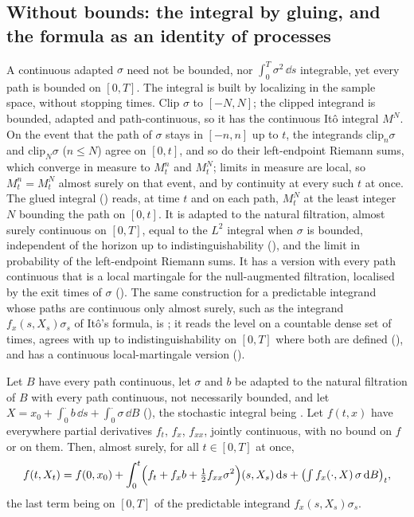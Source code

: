 \documentclass[11pt]{article}
\begin{document}
\subsection{Without bounds: the integral by gluing, and the formula as an identity of processes}\label{sec:unbounded}
A continuous adapted $\sigma$ need not be bounded, nor $\int_0^T\sigma^2\,\dd s$ integrable, yet every path is
bounded on $[0,T]$. The integral is built by localizing in the sample space, without stopping times. Clip $\sigma$ to
$[-N,N]$; the clipped integrand is bounded, adapted and path-continuous, so it has the continuous It\^o integral
$M^N$. On the event that the path of $\sigma$ stays in $[-n,n]$ up to $t$, the integrands $\mathrm{clip}_n\sigma$ and
$\mathrm{clip}_N\sigma$ ($n\le N$) agree on $[0,t]$, and so do their left-endpoint Riemann sums, which converge in
measure to $M^n_t$ and $M^N_t$; limits in measure are local, so $M^n_t=M^N_t$ almost surely on that event, and by
continuity at every such $t$ at once. The glued integral () reads, at time $t$ and on each
path, $M^N_t$ at the least integer $N$ bounding the path on $[0,t]$. It is adapted to the natural filtration, almost
surely continuous on $[0,T]$, equal to the $L^2$ integral when $\sigma$ is bounded, independent of the horizon up to
indistinguishability (), and the limit in probability of the left-endpoint
Riemann sums. It has a version with every path continuous that is a local martingale for the null-augmented
filtration, localised by the exit times of $\sigma$ (). The
same construction for a predictable integrand whose paths are continuous only almost surely, such as the integrand
$f_x(s,X_s)\sigma_s$ of It\^o's formula, is ; it reads the level on a countable dense set of
times, agrees with  up to indistinguishability on $[0,T]$ where both are defined
(), and has a continuous local-martingale version
().

\begin{theorem}\label{thm:process}
Let $B$ have every path continuous, let $\sigma$ and $b$ be adapted to the natural filtration of $B$ with every path
continuous, not necessarily bounded, and let $X=x_0+\int_0^\cdot b\,\dd s+\int_0^\cdot\sigma\,\dd B$
(), the stochastic integral being . Let $f(t,x)$ have everywhere partial
derivatives $f_t$, $f_x$, $f_{xx}$, jointly continuous, with no bound on $f$ or on them. Then, almost surely, for all
$t\in[0,T]$ at once,
\[
  f(t,X_t)=f(0,x_0)+\int_0^t\Bigl(f_t+f_xb+\tfrac12f_{xx}\sigma^2\Bigr)(s,X_s)\,\mathrm{d} s+\bigl(\textstyle\int f_x(\cdot,X)\,\sigma\,\mathrm{d} B\bigr)_t ,
\]
the last term being  on $[0,T]$ of the predictable integrand $f_x(s,X_s)\sigma_s$.
\end{theorem}
\end{document}
